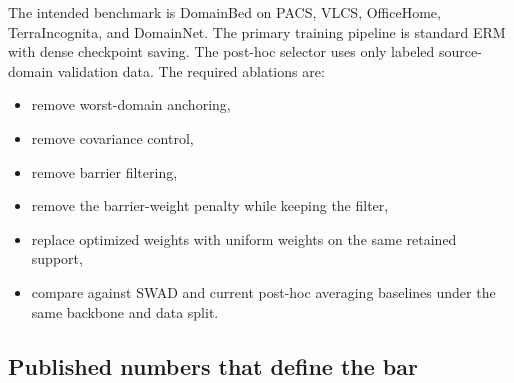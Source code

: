 \documentclass{article}
\theoremstyle{definition}
\newcommand{\swad}{\textup{\textsc{SWAD}}}
\newcommand{\erm}{\textup{\textsc{ERM}}}
\begin{document}
The intended benchmark is DomainBed \citep{gulrajani2021domainbed} on PACS, VLCS, OfficeHome, TerraIncognita, and DomainNet. The primary training pipeline is standard \erm{} with dense checkpoint saving. The post-hoc selector uses only labeled source-domain validation data. The required ablations are:
\begin{itemize}[leftmargin=1.3em]
    \item remove worst-domain anchoring,
    \item remove covariance control,
    \item remove barrier filtering,
    \item remove the barrier-weight penalty while keeping the filter,
    \item replace optimized weights with uniform weights on the same retained support,
    \item compare against \swad{} and current post-hoc averaging baselines under the same backbone and data split.
\end{itemize}

\subsection{Published numbers that define the bar}
\end{document}
